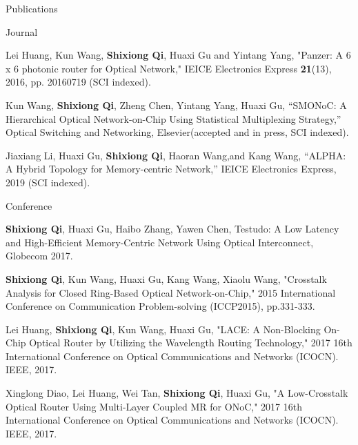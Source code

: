 \documentclass{resume} %
\begin{document}
\begin{rSection}{Publications}
\begin{rSubsection}{Journal}{}{}{}

\item Lei Huang, Kun Wang, {\bf Shixiong Qi}, Huaxi Gu and Yintang Yang, "Panzer: A 6 x 6 photonic router for Optical Network," IEICE Electronics Express {\bf 21}(13), 2016, pp. 20160719 (SCI indexed).

\item Kun Wang, {\bf Shixiong Qi}, Zheng Chen, Yintang Yang, Huaxi Gu, “SMONoC: A Hierarchical Optical Network-on-Chip Using Statistical Multiplexing Strategy,” Optical Switching and Networking, Elsevier(accepted and in press, SCI indexed).

\item Jiaxiang Li, Huaxi Gu, {\bf Shixiong Qi}, Haoran Wang,and Kang Wang, “ALPHA: A Hybrid Topology for Memory-centric Network,” IEICE Electronics Express, 2019 (SCI indexed).

\end{rSubsection}

\begin{rSubsection}{Conference}{}{}{}

\item {\bf Shixiong Qi}, Huaxi Gu, Haibo Zhang, Yawen Chen, Testudo: A Low Latency and High-Efficient Memory-Centric Network Using Optical Interconnect, Globecom 2017.

\item {\bf Shixiong Qi}, Kun Wang, Huaxi Gu, Kang Wang, Xiaolu Wang, "Crosstalk Analysis for Closed Ring-Based Optical Network-on-Chip," 2015 International Conference on Communication Problem-solving (ICCP2015), pp.331-333. 

\item Lei Huang, {\bf Shixiong Qi}, Kun Wang, Huaxi Gu, "LACE: A Non-Blocking On-Chip Optical Router by Utilizing the Wavelength Routing Technology," 2017 16th International Conference on Optical Communications and Networks (ICOCN). IEEE, 2017.
\item Xinglong Diao, Lei Huang, Wei Tan, {\bf Shixiong Qi}, Huaxi Gu, "A Low-Crosstalk Optical Router Using Multi-Layer Coupled MR for ONoC," 2017 16th International Conference on Optical Communications and Networks (ICOCN). IEEE, 2017.

\end{rSubsection}
\end{rSection}
\end{document}
